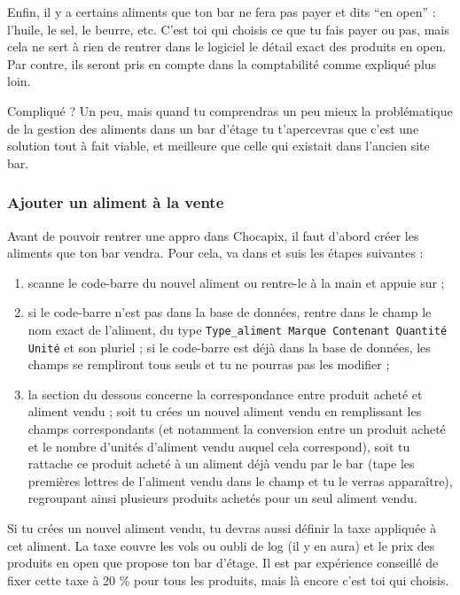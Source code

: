 \documentclass[12pt,french]{article}
\begin{document}
Enfin, il y a certains aliments que ton bar ne fera pas payer et dits \enquote{en open} : l'huile, le sel, le beurre, etc. C'est toi qui choisis ce que tu fais payer ou pas, mais cela ne sert à rien de rentrer dans le logiciel le détail exact des produits en open. Par contre, ils seront pris en compte dans la comptabilité comme expliqué plus loin.

Compliqué ? Un peu, mais quand tu comprendras un peu mieux la problématique de la gestion des aliments dans un bar d'étage tu t'apercevras que c'est une solution tout à fait viable, et meilleure que celle qui existait dans l'ancien site bar.

\subsubsection{Ajouter un aliment à la vente\label{ajout}}

Avant de pouvoir rentrer une appro dans Chocapix, il faut d'abord créer les aliments que ton bar vendra. Pour cela, va dans  et suis les étapes suivantes :
\begin{enumerate}
	\item scanne le code-barre du nouvel aliment ou rentre-le à la main et appuie sur  ;
	\item si le code-barre n'est pas dans la base de données, rentre dans le champ  le nom exact de l'aliment, du type \texttt{Type\_aliment Marque Contenant Quantité Unité} et son pluriel ; si le code-barre est déjà dans la base de données, les champs se rempliront tous seuls et tu ne pourras pas les modifier ;
	\item la section du dessous concerne la correspondance entre produit acheté et aliment vendu ; soit tu crées un nouvel aliment vendu en remplissant les champs correspondants (et notamment la conversion entre un produit acheté et le nombre d'unités d'aliment vendu auquel cela correspond), soit tu rattache ce produit acheté à un aliment déjà vendu par le bar (tape les premières lettres de l'aliment vendu dans le champ  et tu le verras apparaître), regroupant ainsi plusieurs produits achetés pour un seul aliment vendu.
\end{enumerate}
Si tu crées un nouvel aliment vendu, tu devras aussi définir la taxe appliquée à cet aliment. La taxe couvre les vols ou oubli de log (il y en aura) et le prix des produits en open que propose ton bar d'étage. Il est par expérience conseillé de fixer cette taxe à 20 \% pour tous les produits, mais là encore c'est toi qui choisis.
\end{document}
